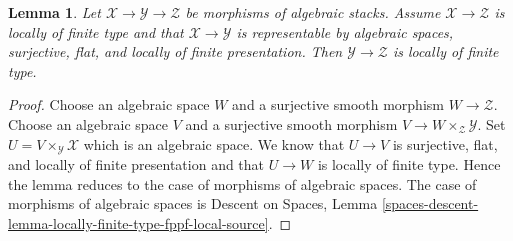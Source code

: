 \documentclass[10pt,a4paper]{amsart}
\theoremstyle{plain}
\newtheorem{lemma}[subsection]{Lemma}
\theoremstyle{definition}
\theoremstyle{remark}
\numberwithin{equation}{subsection}
\begin{document}
\begin{lemma}
\label{lemma-check-finite-type-precompose}
Let $\mathcal{X} \to \mathcal{Y} \to \mathcal{Z}$ be morphisms of
algebraic stacks. Assume $\mathcal{X} \to \mathcal{Z}$ is locally of finite
type and that $\mathcal{X} \to \mathcal{Y}$ is representable by algebraic
spaces, surjective, flat, and locally of finite presentation.
Then $\mathcal{Y} \to \mathcal{Z}$ is locally of finite type.
\end{lemma}

\begin{proof}
Choose an algebraic space $W$ and a surjective smooth morphism
$W \to \mathcal{Z}$. Choose an algebraic space $V$ and a surjective smooth
morphism $V \to W \times_\mathcal{Z} \mathcal{Y}$. Set
$U = V \times_\mathcal{Y} \mathcal{X}$ which is an algebraic space.
We know that $U \to V$ is surjective, flat, and locally of finite presentation
and that $U \to W$ is locally of finite type.
Hence the lemma reduces to the case of morphisms of algebraic spaces.
The case of morphisms of algebraic spaces is
Descent on Spaces, Lemma
\ref{spaces-descent-lemma-locally-finite-type-fppf-local-source}.
\end{proof}
\end{document}
